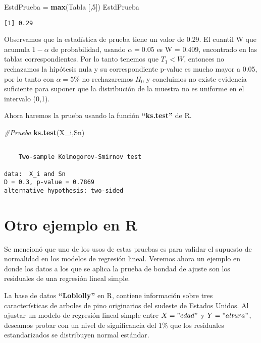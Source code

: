 \documentclass[
  a4paper,
  oneside,
  openany]{book}
\newenvironment{Shaded}{\begin{snugshade}}{\end{snugshade}}
\newcommand{\CommentTok}[1]{\textcolor[rgb]{0.56,0.35,0.01}{\textit{#1}}}
\newcommand{\DecValTok}[1]{\textcolor[rgb]{0.00,0.00,0.81}{#1}}
\newcommand{\FunctionTok}[1]{\textcolor[rgb]{0.13,0.29,0.53}{\textbf{#1}}}
\newcommand{\NormalTok}[1]{#1}
\newcommand{\OtherTok}[1]{\textcolor[rgb]{0.56,0.35,0.01}{#1}}
\begin{document}
\begin{Shaded}
\begin{Highlighting}[]
\NormalTok{EstdPrueba }\OtherTok{=} \FunctionTok{max}\NormalTok{(Tabla [,}\DecValTok{5}\NormalTok{])}
\NormalTok{EstdPrueba}
\end{Highlighting}
\end{Shaded}

\begin{verbatim}
[1] 0.29
\end{verbatim}

Observamos que la estadística de prueba tiene un valor de 0.29. El cuantil W que acumula \(1-\alpha\) de probabilidad, usando \(\alpha=0.05\) es W = 0.409, encontrado en las tablas correspondientes. Por lo tanto tenemos que \(T_1 < W\), entonces no rechazamos la hipótesis nula y su correspondiente p-value es mucho mayor a 0.05, por lo tanto con \(\alpha=5\%\) no rechazaremos \(H_0\) y concluimos no existe evidencia suficiente para suponer que la distribución de la muestra no es uniforme en el intervalo (0,1).

Ahora haremos la prueba usando la función \textbf{``ks.test''} de R.

\begin{Shaded}
\begin{Highlighting}[]
\CommentTok{\#Prueba}
\FunctionTok{ks.test}\NormalTok{(X\_i,Sn)}
\end{Highlighting}
\end{Shaded}

\begin{verbatim}

    Two-sample Kolmogorov-Smirnov test

data:  X_i and Sn
D = 0.3, p-value = 0.7869
alternative hypothesis: two-sided
\end{verbatim}

\hypertarget{otro-ejemplo-en-r}{%
\section{Otro ejemplo en R}\label{otro-ejemplo-en-r}}

Se mencionó que uno de los usos de estas pruebas es para validar el supuesto de normalidad en los modelos de regresión lineal. Veremos ahora un ejemplo en donde los datos a los que se aplica la prueba de bondad de ajuste son los residuales de una regresión lineal simple.

La base de datos \textbf{``Loblolly''} en R, contiene información sobre tres características de arboles de pino originarios del sudeste de Estados Unidos. Al ajustar un modelo de regresión lineal simple entre \(X="edad"\) y \(Y="altura"\), deseamos probar con un nivel de significancia del \(1\%\) que los residuales estandarizados se distribuyen normal estándar.
\end{document}

